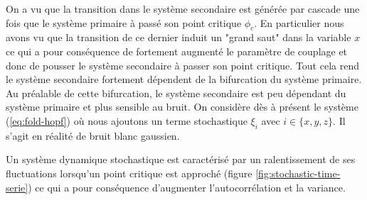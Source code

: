 



On a vu que la transition dans le système secondaire est générée par cascade une fois que le système primaire à passé son point critique $\phi_c$. En particulier nous avons vu que la transition de ce dernier induit un "grand saut" dans la variable $x$ ce qui a pour conséquence de fortement augmenté le paramètre de couplage et donc de pousser le système secondaire à passer son point critique. Tout cela rend le système secondaire fortement dépendent de la bifurcation du système primaire. Au préalable de cette bifurcation, le système secondaire est peu dépendant du système primaire et plus sensible au bruit.
On considère dès à présent le système (\ref{eq:fold-hopf}) où nous ajoutons un terme stochastique $\xi_i$ avec $i \in \{x, y, z\}$. Il s'agit en réalité de bruit blanc gaussien.

Un système dynamique stochastique est caractérisé par un ralentissement de ses fluctuations lorsqu'un point critique est approché (figure \ref{fig:stochastic-time-serie}) ce qui a pour conséquence d'augmenter l'autocorrélation et la variance.

